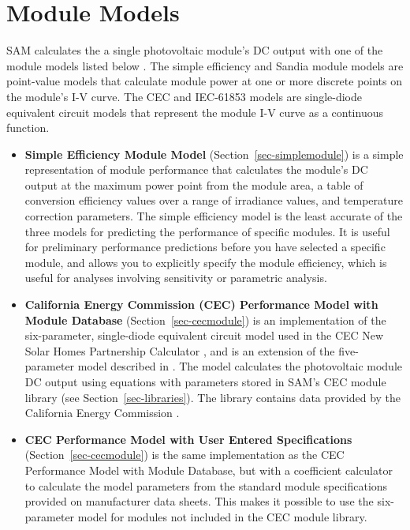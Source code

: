 \documentclass[12pt,letterpaper]{article}
\begin{document}
\section{Module Models}\label{sec-moduleoptions}

SAM calculates the a single photovoltaic module's DC output with one of the module models listed below \citep{blair2013}. The simple efficiency and Sandia module models are point-value models that calculate module power at one or more discrete points on the module's I-V curve. The CEC and IEC-61853 models are single-diode equivalent circuit models that represent the module I-V curve as a continuous function.

\begin{itemize}
\item \textbf{Simple Efficiency Module Model} (Section~\ref{sec-simplemodule}) is a simple representation of module performance that calculates the module's DC output at the maximum power point from the module area, a table of conversion efficiency values over a range of irradiance values, and temperature correction parameters. The simple efficiency model is the least accurate of the three models for predicting the performance of specific modules. It is useful for preliminary performance predictions before you have selected a specific module, and allows you to explicitly specify the module efficiency, which is useful for analyses involving sensitivity or parametric analysis.
\item \textbf{California Energy Commission (CEC) Performance Model with Module Database} (Section~\ref{sec-cecmodule}) is an implementation of the six-parameter, single-diode equivalent circuit model used in the CEC New Solar Homes Partnership Calculator \citep{gsc2014a}, and is an extension of the five-parameter model described in \citet{desoto2004a}. The model calculates the photovoltaic module DC output using equations with parameters stored in SAM's CEC module library (see Section~\ref{sec-libraries}). The library contains data provided by the California Energy Commission \citep{gsc2014a} \citep{gsc2014b}.
\item \textbf{CEC Performance Model with User Entered Specifications}  (Section~\ref{sec-cecmodule}) is the same implementation as the CEC Performance Model with Module Database, but with a coefficient calculator \citep{dobos2012a} to calculate the model parameters from the standard module specifications provided on manufacturer data sheets. This makes it possible to use the six-parameter model for modules not included in the CEC module library.

\end{itemize}
\end{document}
